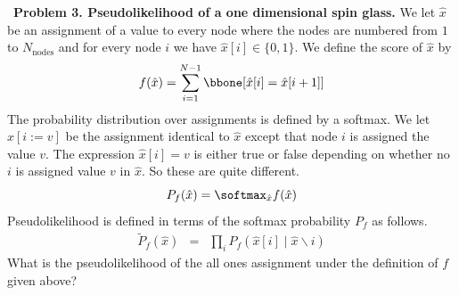 \documentclass{article}
\newcommand{\solution}[1]{}
\begin{document}
~{\bf Problem 3. Pseudolikelihood of a one dimensional spin glass.}
We let $\hat{x}$ be an assignment of a value to every node where the nodes are numbered from $1$ to $N_\mathrm{nodes}$ and for every node $i$ we have
$\hat{x}[i] \in \{0,1\}$. We define the score of $\hat{x}$ by
$$f(\hat{x}) = \sum_{i = 1}^{N-1} \bbone[\hat{x}[i] = \hat{x}[i+1]]$$
The probability distribution over assignments is defined by a softmax.  We let $\hat{x}[i:=v]$ be the assignment identical to $\hat{x}$ except that node $i$ is assigned the value $v$.
The expression $\hat{x}[i]=v$ is either true or false depending on whether no $i$ is assigned value $v$ in $\hat{x}$.  So these are quite different.
$$P_f(\hat{x}) = \softmax_{\hat{x}} f(\hat{x})$$
Pseudolikelihood is defined in terms of the softmax probability $P_f$ as follows.
\begin{eqnarray*}
  \tilde{P}_f(\hat{x}) & = & \prod_i P_f(\hat{x}[i] \;|\; \hat{x}\backslash i)
\end{eqnarray*}
What is the pseudolikelihood of the all ones assignment under the definition of $f$ given above?

\solution{
In a graphical model $P_f(\hat{x}[i] \;|\; \hat{x}/i)$ is determined by the neighbors of $i$ and we can consider only how a value is scored against it neighbors.  For $\hat{x}$ equal to all ones we have

\begin{eqnarray*}
f(\hat{x}) & = & N-1 \\
\\
f(\hat{x}[i := 0]) & = & \left\{\begin{array}{ll} N-3 & \mbox{for $1 < i < N$} \\ N-2 & \mbox{for $i=1$ or $i=N$} \end{array}\right.
\end{eqnarray*}
For $1 < i < N$ we get
\begin{eqnarray*}
Q_f(\hat{x}[i=1]\; |\;\hat{x}/i) & = & \frac{e^{N-1}}{e^{N-1} + e^{N-3}} \\
\\
& = & \frac{1}{1 + e^{-2}}
\end{eqnarray*}
and for $i = 1$ or $i = N$ we get
$$Q_f(\hat{x}[i=1]\; |\;\hat{x}/i) = \frac{1}{1 + e^{-1}}$$

This gives

$$\tilde{Q}(\hat{x}) = (1 + e^{-1})^{-2}(1 + e^{-2})^{-(N-2)}$$
}
\end{document}
